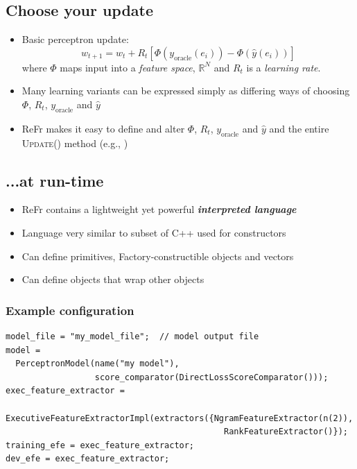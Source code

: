 \documentclass[noback,portrait,twocolumn]{cuposter}
\begin{document}
\subsection{Choose your update}
\begin{itemize}
  \item Basic perceptron update: \[
        w_{t+1}=w_{t}+R_{t}\left[\Phi\left(y_{\mathrm{oracle}}\left(e_{i}\right)\right)-\Phi\left(\hat{y}\left(e_{i}\right)\right)\right] \]
        where $\Phi$ maps input into a \textit{feature space}, $\mathbb{R}^{N}$
        and $R_t$ is a \textit{learning rate}.
  \item Many learning variants can be expressed simply as differing ways of choosing $\Phi$, $R_t$, $y_{\mathrm{oracle}}$ and $\hat{y}$
  \item ReFr makes it easy to define and alter $\Phi$, $R_t$, $y_{\mathrm{oracle}}$ and $\hat{y}$ and the entire \textsc{Update()} method (e.g., \cite{hazan2010direct,crammer2003ultraconservative})
\end{itemize}

\subsection{...at run-time}

\begin{itemize}
  \item ReFr contains a lightweight yet powerful \textit{\textbf{interpreted language}}
  \item Language very similar to subset of C++ used for constructors
  \item Can define primitives, Factory-constructible objects and vectors
  \item Can define objects that wrap other objects
\end{itemize}

\columnbreak

\subsubsection{Example configuration}
\small
\begin{verbatim}
model_file = "my_model_file";  // model output file
model =
  PerceptronModel(name("my model"),
                  score_comparator(DirectLossScoreComparator()));
exec_feature_extractor =
  ExecutiveFeatureExtractorImpl(extractors({NgramFeatureExtractor(n(2)),
                                            RankFeatureExtractor()});
training_efe = exec_feature_extractor;
dev_efe = exec_feature_extractor;
\end{verbatim}
\normalsize
\end{document}
